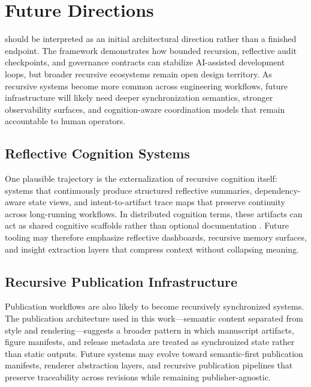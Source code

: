 \section{Future Directions}
\label{sec:future-directions}

 should be interpreted as an initial architectural direction rather than a finished endpoint. The framework demonstrates how bounded recursion, reflective audit checkpoints, and governance contracts can stabilize AI-assisted development loops, but broader recursive ecosystems remain open design territory. As recursive systems become more common across engineering workflows, future infrastructure will likely need deeper synchronization semantics, stronger observability surfaces, and cognition-aware coordination models that remain accountable to human operators.

\subsection{Reflective Cognition Systems}

One plausible trajectory is the externalization of recursive cognition itself: systems that continuously produce structured reflective summaries, dependency-aware state views, and intent-to-artifact trace maps that preserve continuity across long-running workflows. In distributed cognition terms, these artifacts can act as shared cognitive scaffolds rather than optional documentation \cite{Hutchins1995CognitionWild}. Future tooling may therefore emphasize reflective dashboards, recursive memory surfaces, and insight extraction layers that compress context without collapsing meaning.

\subsection{Recursive Publication Infrastructure}

Publication workflows are also likely to become recursively synchronized systems. The publication architecture used in this work---semantic content separated from style and rendering---suggests a broader pattern in which manuscript artifacts, figure manifests, and release metadata are treated as synchronized state rather than static outputs. Future systems may evolve toward semantic-first publication manifests, renderer abstraction layers, and recursive publication pipelines that preserve traceability across revisions while remaining publisher-agnostic.

